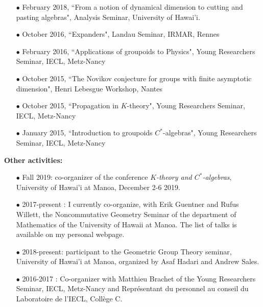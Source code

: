 \documentclass[a4paper,11pt]{article}
\newcommand\espace{\vrule height 20pt width 0pt}
\begin{document}
\begin{itemize}
\item[$\bullet$] February 2018, ``From a notion of dynamical dimension to cutting and pasting algebras", Analysis Seminar, University of Hawai'i.
\item[$\bullet$] October 2016, ``Expanders", Landau Seminar, IRMAR, Rennes %
\item[$\bullet$] February 2016, ``Applications of groupoids to Physics", Young Researchers Seminar, IECL, Metz-Nancy
\item[$\bullet$] October 2015, ``The Novikov conjecture for groups with finite asymptotic dimension", Henri Lebesgue Workshop, Nantes
\item[$\bullet$] October 2015, ``Propagation in $K$-theory", Young Researchers Seminar, IECL, Metz-Nancy
\item[$\bullet$] January 2015, ``Introduction to groupoids $C^*$-algebras", Young Researchers Seminar, IECL, Metz-Nancy
\end{itemize}
\espace

\textbf{Other activities:} 
\begin{itemize}
\item[$\bullet$] Fall 2019: co-organizer of the conference \textit{$K$-theory and $C^*$-algebras}, University of Hawai'i at Manoa, December 2-6 2019. 
\item[$\bullet$] 2017-present : I currently co-organize, with Erik Guentner and Rufus Willett, the Noncommutative Geometry Seminar of the department of Mathematics of the University of Hawaii at Manoa. The list of talks is available on my personal webpage.
\item[$\bullet$] 2018-present: participant to the Geometric Group Theory seminar, University of Hawai'i at Manoa, organized by Asaf Hadari and Andrew Sales.
\item[$\bullet$] 2016-2017 : Co-organizer with Matthieu Brachet of the Young Researchers Seminar, IECL, Metz-Nancy and Représentant du personnel au conseil du Laboratoire de l'IECL, Collège C.
\end{itemize}
\end{document}
